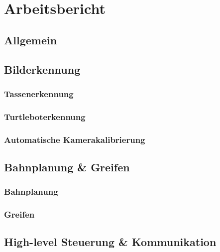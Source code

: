 \documentclass[de,ids]{fziartcl}
\begin{document}
\section{Arbeitsbericht} %
\subsection{Allgemein}
\subsection{Bilderkennung}
\subsubsection{Tassenerkennung}
\label{3-1-1_arbeitsbericht_tassenerkennung}
\subsubsection{Turtleboterkennung}
\subsubsection{Automatische Kamerakalibrierung}
\subsection{Bahnplanung \& Greifen}
\subsubsection{Bahnplanung}
\subsubsection{Greifen}

\subsection{High-level Steuerung \& Kommunikation}

\end{document}
